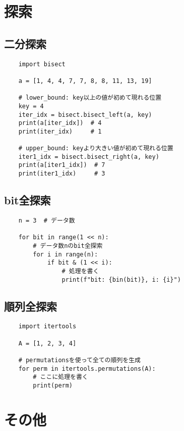 \documentclass[a4paper, landscape, 9pt]{jarticle} %
\begin{document}
\begin{multicols*}{3}
\begin{lstlisting}
    \end{lstlisting}

    \section{探索}

    \subsection{二分探索}
    
    \begin{lstlisting}
    import bisect

    a = [1, 4, 4, 7, 7, 8, 8, 11, 13, 19]
    
    # lower_bound: key以上の値が初めて現れる位置
    key = 4
    iter_idx = bisect.bisect_left(a, key)
    print(a[iter_idx])  # 4
    print(iter_idx)     # 1
    
    # upper_bound: keyより大きい値が初めて現れる位置
    iter1_idx = bisect.bisect_right(a, key)
    print(a[iter1_idx])  # 7
    print(iter1_idx)     # 3
    \end{lstlisting}

    \subsection{bit全探索}
    \begin{lstlisting}
    n = 3  # データ数

    for bit in range(1 << n):
        # データ数nのbit全探索
        for i in range(n):
            if bit & (1 << i):
                # 処理を書く
                print(f"bit: {bin(bit)}, i: {i}")
    \end{lstlisting}

    \subsection{順列全探索}
    \begin{lstlisting}
    import itertools

    A = [1, 2, 3, 4]
    
    # permutationsを使って全ての順列を生成
    for perm in itertools.permutations(A):
        # ここに処理を書く
        print(perm)
    \end{lstlisting}

    \section{その他}

\end{multicols*}
\end{document}
